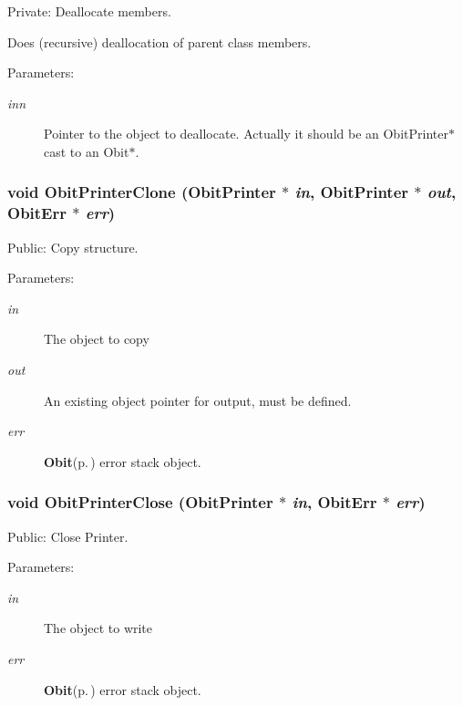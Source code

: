 Private: Deallocate members. 

Does (recursive) deallocation of parent class members. \begin{Desc}
\item[Parameters:]
\begin{description}
\item[{\em inn}]Pointer to the object to deallocate. Actually it should be an Obit\-Printer$\ast$ cast to an Obit$\ast$. \end{description}
\end{Desc}
\subsubsection{\setlength{\rightskip}{0pt plus 5cm}void Obit\-Printer\-Clone ({\bf Obit\-Printer} $\ast$ {\em in}, {\bf Obit\-Printer} $\ast$ {\em out}, {\bf Obit\-Err} $\ast$ {\em err})}\label{ObitPrinter_8c_a9}


Public: Copy structure. 

\begin{Desc}
\item[Parameters:]
\begin{description}
\item[{\em in}]The object to copy \item[{\em out}]An existing object pointer for output, must be defined. \item[{\em err}]{\bf Obit}{\rm (p.\,\pageref{structObit})} error stack object. \end{description}
\end{Desc}
\subsubsection{\setlength{\rightskip}{0pt plus 5cm}void Obit\-Printer\-Close ({\bf Obit\-Printer} $\ast$ {\em in}, {\bf Obit\-Err} $\ast$ {\em err})}\label{ObitPrinter_8c_a13}


Public: Close Printer. 

\begin{Desc}
\item[Parameters:]
\begin{description}
\item[{\em in}]The object to write \item[{\em err}]{\bf Obit}{\rm (p.\,\pageref{structObit})} error stack object. \end{description}
\end{Desc}
